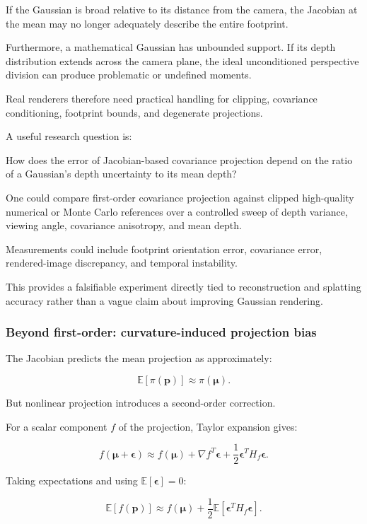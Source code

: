 If the Gaussian is broad relative to its distance from the camera, the Jacobian at the mean may no longer adequately describe the entire footprint.

Furthermore, a mathematical Gaussian has unbounded support. If its depth distribution extends across the camera plane, the ideal unconditioned perspective division can produce problematic or undefined moments.

Real renderers therefore need practical handling for clipping, covariance conditioning, footprint bounds, and degenerate projections.

A useful research question is:

How does the error of Jacobian-based covariance projection depend on the ratio of a Gaussian's depth uncertainty to its mean depth?

One could compare first-order covariance projection against clipped high-quality numerical or Monte Carlo references over a controlled sweep of depth variance, viewing angle, covariance anisotropy, and mean depth.

Measurements could include footprint orientation error, covariance error, rendered-image discrepancy, and temporal instability.

This provides a falsifiable experiment directly tied to reconstruction and splatting accuracy rather than a vague claim about improving Gaussian rendering.

\subsubsection{Beyond first-order: curvature-induced projection bias}\label{02-foundations-ii-ch021-beyond-first-order-curvature-induced-projection-bias}

The Jacobian predicts the mean projection as approximately:

\[
\mathbb E[\pi(\mathbf p)] \approx\pi(\boldsymbol\mu).
\]

But nonlinear projection introduces a second-order correction.

For a scalar component \(f\) of the projection, Taylor expansion gives:

\[
f(\boldsymbol\mu+\boldsymbol\epsilon) \approx f(\boldsymbol\mu) + \nabla f^T\boldsymbol\epsilon + \frac12\boldsymbol\epsilon^TH_f\boldsymbol\epsilon.
\]

Taking expectations and using \(\mathbb E[\boldsymbol\epsilon]=0\):

\[
\mathbb E[f(\mathbf p)] \approx f(\boldsymbol\mu) + \frac12\mathbb E[ \boldsymbol\epsilon^TH_f\boldsymbol\epsilon ].
\]

